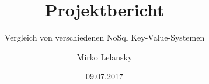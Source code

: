 \documentclass[a4paper, fontsize=11pt]{scrreprt}
\begin{document}
\author{Mirko Lelansky}
\title{Projektbericht}
\subtitle{Vergleich von verschiedenen NoSql Key-Value-Systemen}
\date{09.07.2017}
\maketitle
\tableofcontents
\clearpage
\end{document}

